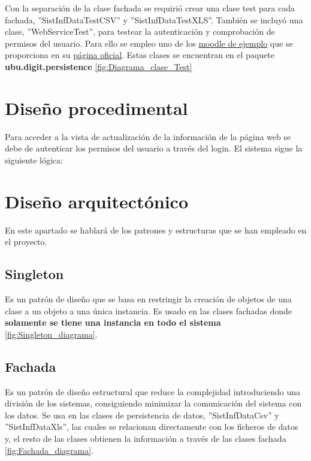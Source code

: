 Con la separación de la clase fachada se requirió crear una clase test para cada fachada, ''SistInfDataTestCSV'' y ''SistInfDataTestXLS''. También se incluyó una clase, ''WebServiceTest'', para testear la autenticación y comprobación de permisos del usuario. Para ello se empleo uno de los \href{https://school.moodledemo.net/}{moodle de ejemplo} que se proporciona en su \href{https://moodle.org/demo}{página oficial}. Estas clases se encuentran en el paquete \textbf{ubu.digit.persistence} \ref{fig:Diagrama_clase_Test}


\section{Diseño procedimental}

Para acceder a la vista de actualización de la información de la página web se debe de autenticar los permisos del usuario a través del login. El sistema sigue la siguiente lógica:	

\section{Diseño arquitectónico}

En este apartado se hablará de los patrones y estructuras que se han empleado en el proyecto.

\subsection{Singleton}
Es un patrón de diseño que se basa en restringir la creación de objetos de una clase a un objeto a una única instancia. Es usado en las clases fachadas donde \textbf{solamente se tiene una instancia en todo el sistema} \ref{fig:Singleton_diagrama}.


\subsection{Fachada}
Es un patrón de diseño estructural que reduce la complejidad introduciendo una división de los sistemas, consiguiendo minimizar la comunicación del sistema con los datos. 
Se usa en las clases de persistencia de datos, ''SistInfDataCsv'' y ''SistInfDataXls'', las cuales se relacionan directamente con los ficheros de datos y, el resto de las clases obtienen la información a través de las clases fachada \ref{fig:Fachada_diagrama}.

